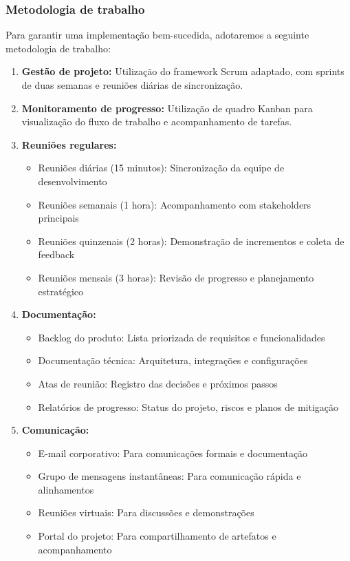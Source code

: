 \documentclass[12pt,a4paper]{article}
\begin{document}
\subsubsection{Metodologia de trabalho}

Para garantir uma implementação bem-sucedida, adotaremos a seguinte metodologia de trabalho:

\begin{enumerate}
    \item \textbf{Gestão de projeto:} Utilização do framework Scrum adaptado, com sprints de duas semanas e reuniões diárias de sincronização.
    
    \item \textbf{Monitoramento de progresso:} Utilização de quadro Kanban para visualização do fluxo de trabalho e acompanhamento de tarefas.
    
    \item \textbf{Reuniões regulares:}
    \begin{itemize}
        \item Reuniões diárias (15 minutos): Sincronização da equipe de desenvolvimento
        \item Reuniões semanais (1 hora): Acompanhamento com stakeholders principais
        \item Reuniões quinzenais (2 horas): Demonstração de incrementos e coleta de feedback
        \item Reuniões mensais (3 horas): Revisão de progresso e planejamento estratégico
    \end{itemize}
    
    \item \textbf{Documentação:}
    \begin{itemize}
        \item Backlog do produto: Lista priorizada de requisitos e funcionalidades
        \item Documentação técnica: Arquitetura, integrações e configurações
        \item Atas de reunião: Registro das decisões e próximos passos
        \item Relatórios de progresso: Status do projeto, riscos e planos de mitigação
    \end{itemize}
    
    \item \textbf{Comunicação:}
    \begin{itemize}
        \item E-mail corporativo: Para comunicações formais e documentação
        \item Grupo de mensagens instantâneas: Para comunicação rápida e alinhamentos
        \item Reuniões virtuais: Para discussões e demonstrações
        \item Portal do projeto: Para compartilhamento de artefatos e acompanhamento
    \end{itemize}
    

\end{enumerate}
\end{document}
